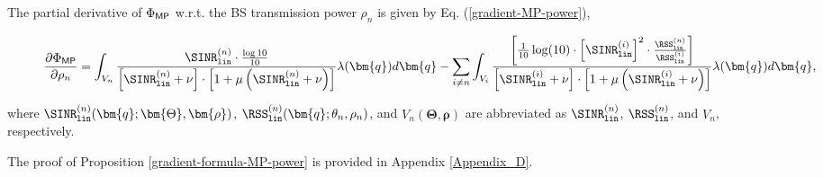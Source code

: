 \begin{Proposition}\label{gradient-formula-MP-power}
The partial derivative of $\Phi_{{\sf MP}}$ w.r.t. the BS transmission power $\rho_n$ is given by Eq. (\ref{gradient-MP-power}),
\begin{figure*}[t!]
    \begin{multline}\label{gradient-MP-power}
    \frac{\partial \Phi_{{\sf MP}}}{\partial \rho_n} =   \int_{V_n }  \frac{\SINR^{(n)}_{\mathtt{lin}} \cdot \frac{\log 10}{10}}{\left[\SINR^{(n)}_{\mathtt{lin}} + \nu \right] \cdot 
    \left[ 1 + \mu \left( \SINR^{(n)}_{\mathtt{lin}} + \nu \right) \right] }   \lambda(\bm{q})d\bm{q}   
    - \sum_{i\neq n}   \int_{V_i }     \frac{\left[\frac{1}{10}\log (10) \cdot \left[ \SINR^{(i)}_{\mathtt{lin}} \right]^2 \cdot \frac{\RSS^{(n)}_{\mathtt{lin}}}{\RSS^{(i)}_{\mathtt{lin}}}
    \right]}{\left[\SINR^{(i)}_{\mathtt{lin}} + \nu \right] \cdot 
    \left[ 1 + \mu \left( \SINR^{(i)}_{\mathtt{lin}} + \nu \right) \right] }  
     \lambda(\bm{q})d\bm{q},
\end{multline}
\end{figure*}
where $\SINR^{(n)}_{\mathtt{lin}}(\bm{q}; \bm{\Theta}, \bm{\rho})$, $\RSS^{(n)}_{\mathtt{lin}}(\bm{q}; \theta_n, \rho_n)$, and $V_n(\bm{\Theta}, \bm{\rho})$ are abbreviated as
$\SINR^{(n)}_{\mathtt{lin}} $, $\RSS^{(n)}_{\mathtt{lin}}$, and $V_n$, respectively. 
\end{Proposition}
The proof of Proposition \ref{gradient-formula-MP-power} is provided in Appendix \ref{Appendix_D}.



